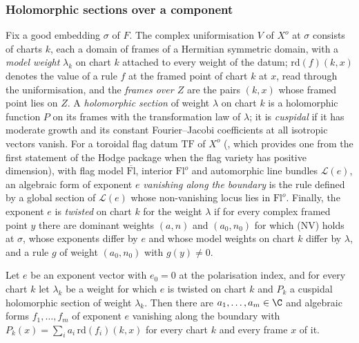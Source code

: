 \subsubsection*{Holomorphic sections over a component}
Fix a good embedding $\sigma$ of $F$. The complex uniformisation $V$ of $X^o$ at $\sigma$ consists of charts
$k$, each a domain of frames of a Hermitian symmetric domain, with a \emph{model weight} $\lambda_k$ on chart
$k$ attached to every weight of the datum; $\mathrm{rd}(f)(k,x)$ denotes the value of a rule $f$ at the
framed point of chart $k$ at $x$, read through the uniformisation, and the \emph{frames over $Z$} are the
pairs $(k,x)$ whose framed point lies on $Z$. A \emph{holomorphic section} of weight $\lambda$ on chart $k$ is a
holomorphic function $P$ on its frames with the transformation law of $\lambda$; it is \emph{cuspidal} if
it has moderate growth and its constant Fourier--Jacobi coefficients at all isotropic vectors vanish. For a
toroidal flag datum $\mathrm{TF}$ of $X^o$ (,
which provides one from the first statement of the Hodge package when the flag variety has positive
dimension), with flag model $\overline{\mathrm{Fl}}$, interior $\mathrm{Fl}^o$ and automorphic line bundles
$\mathcal L(e)$, an algebraic form of exponent $e$ \emph{vanishing along the boundary} is the rule defined by
a global section of $\mathcal L(e)$ whose non-vanishing locus lies in $\mathrm{Fl}^o$. Finally, the exponent
$e$ is \emph{twisted} on chart $k$ for the weight $\lambda$ if for every complex framed point $y$ there are
dominant weights $(a,n)$ and $(a_0,n_0)$ for which (NV) holds at $\sigma$, whose exponents differ by $e$ and
whose model weights on chart $k$ differ by $\lambda$, and a rule $g$ of weight $(a_0,n_0)$ with $g(y)\ne0$.

\begin{lemma}\label{pf:covol:lem:comb}
Let $e$ be an exponent vector with $e_0=0$ at the polarisation index, and for every chart $k$ let
$\lambda_k$ be a weight for which $e$ is twisted on chart $k$ and $P_k$ a cuspidal holomorphic section of
weight $\lambda_k$. Then there are $a_1,\dots,a_m\in\C$ and algebraic forms $f_1,\dots,f_m$ of exponent $e$
vanishing along the boundary with $P_k(x)=\sum_ia_i\,\mathrm{rd}(f_i)(k,x)$ for every chart $k$ and every
frame $x$ of it.
\end{lemma}


